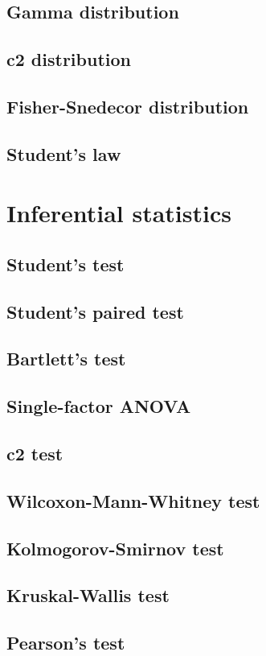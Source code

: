 \documentclass{report}
\begin{document}
	\section{Gamma distribution}
	\section{c2 distribution}
	\section{Fisher-Snedecor distribution}
	\section{Student’s law}

\chapter{Inferential statistics}
	\section{Student’s test}
	\section{Student’s paired test}
	\section{Bartlett’s test}
	\section{Single-factor ANOVA}
	\section{c2 test}
	\section{Wilcoxon-Mann-Whitney test}
	\section{Kolmogorov-Smirnov test}
	\section{Kruskal-Wallis test}
	\section{Pearson’s test}
\end{document}
